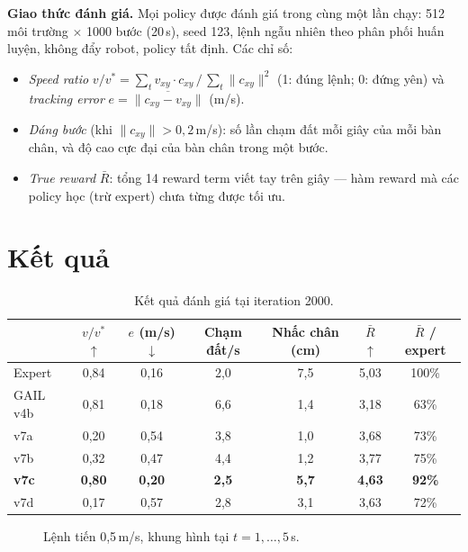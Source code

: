 \textbf{Giao thức đánh giá.} Mọi policy được đánh giá trong cùng một lần chạy: 512 môi
trường $\times$ 1000 bước (20\,s), seed 123, lệnh ngẫu nhiên theo phân phối huấn luyện,
không đẩy robot, policy tất định. Các chỉ số:
\begin{itemize}[leftmargin=*,itemsep=1pt]
  \item \emph{Speed ratio} $v/v^* = \sum_t v_{xy}\!\cdot c_{xy} \,/\, \sum_t \|c_{xy}\|^2$
    (1: đúng lệnh; 0: đứng yên) và \emph{tracking error}
    $e = \overline{\|c_{xy} - v_{xy}\|}$ (m/s).
  \item \emph{Dáng bước} (khi $\|c_{xy}\| > 0{,}2$\,m/s): số lần chạm đất mỗi giây của mỗi
    bàn chân, và độ cao cực đại của bàn chân trong một bước.
  \item \emph{True reward} $\bar R$: tổng 14 reward term viết tay trên giây --- hàm reward
    mà các policy học (trừ expert) chưa từng được tối ưu.
\end{itemize}

\section{Kết quả}
\begin{table}[H]
\centering
\caption{Kết quả đánh giá tại iteration 2000.}
\label{tab:res}
\small
\begin{tabular}{@{}lcccccc@{}}
\toprule
 & $v/v^*$ $\uparrow$ & $e$ (m/s) $\downarrow$ & Chạm đất/s & Nhấc chân (cm) & $\bar R$ $\uparrow$ & $\bar R$ / expert \\
\midrule
Expert             & 0,84 & 0,16 & 2,0 & 7,5 & 5,03 & 100\% \\
GAIL v4b           & 0,81 & 0,18 & 6,6 & 1,4 & 3,18 & 63\% \\
\midrule
v7a                & 0,20 & 0,54 & 3,8 & 1,0 & 3,68 & 73\% \\
v7b                & 0,32 & 0,47 & 4,4 & 1,2 & 3,77 & 75\% \\
\textbf{v7c}       & \textbf{0,80} & \textbf{0,20} & \textbf{2,5} & \textbf{5,7} & \textbf{4,63} & \textbf{92\%} \\
v7d                & 0,17 & 0,57 & 2,8 & 3,1 & 3,63 & 72\% \\
\bottomrule
\end{tabular}
\end{table}

\begin{figure}[H]
\centering
{}
\caption{Lệnh tiến 0,5\,m/s, khung hình tại $t = 1, \dots, 5$\,s.}
\label{fig:snaps}
\end{figure}

